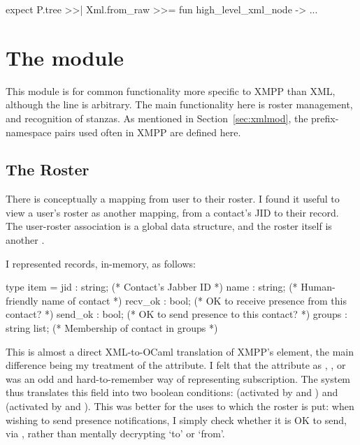 \documentclass[12pt,a4paper,twoside,openright]{report}
\begin{document}
{\begin{ocaml}
expect P.tree >>| Xml.from_raw >>= fun high_level_xml_node -> ...
\end{ocaml}

\section{The  module}
This module is for common functionality more specific to XMPP than XML, although the line is arbitrary. The main functionality here is roster management, and recognition of stanzas. As mentioned in Section~\ref{sec:xmlmod}, the prefix-namespace pairs used often in XMPP are defined here.

\subsection{The Roster}
There is conceptually a mapping from user to their roster. I found it useful to view a user's roster as another mapping, from a contact's JID to their  record. The user-roster association is a global  data structure, and the roster itself is another .

I represented  records, in-memory, as follows:

\hspace*{-\parindent}%
\begin{minipage}{\linewidth}
  \begin{ocaml}
    type item = {
      jid     : string;        (* Contact's Jabber ID                       *)
      name    : string;        (* Human-friendly name of contact            *)
      recv_ok : bool;          (* OK to receive presence from this contact? *)
      send_ok : bool;          (* OK to send presence to this contact?      *)
      groups  : string list; (* Membership of contact in groups           *)
    }
  \end{ocaml}
\end{minipage}

This is almost a direct XML-to-OCaml translation of XMPP's  element, the main difference being my treatment of the  attribute. I felt that the  attribute as , ,  or  was an odd and hard-to-remember way of representing subscription. The system thus translates this field into two boolean conditions:  (activated by  and ) and  (activated by  and ). This was better for the uses to which the roster is put: when wishing to send presence notifications, I simply check whether it is OK to send, via , rather than mentally decrypting `to' or `from'.

}
\end{document}
